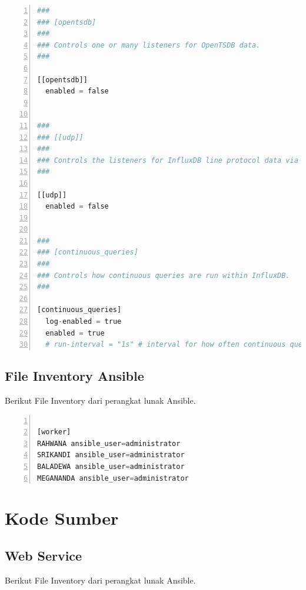 \begin{lstlisting}[numbers=left, frame=single,tabsize=2,breaklines,caption={Kode sumber Model Auth},label=modelAuth, language=python]
###
### [opentsdb]
###
### Controls one or many listeners for OpenTSDB data.
###

[[opentsdb]]
  enabled = false
 

###
### [[udp]]
###
### Controls the listeners for InfluxDB line protocol data via UDP.
###

[[udp]]
  enabled = false
 

###
### [continuous_queries]
###
### Controls how continuous queries are run within InfluxDB.
###

[continuous_queries]
  log-enabled = true
  enabled = true
  # run-interval = "1s" # interval for how often continuous queries will be checked if they need to run

\end{lstlisting}

\section{File Inventory Ansible}
\label{lampiranpushnotif}
  Berikut File Inventory dari perangkat lunak Ansible.
  
  \begin{lstlisting}[numbers=left, frame=single,tabsize=2,breaklines,caption={Kode sumber Model Auth},label=modelAuth, language=python]

[worker]
RAHWANA ansible_user=administrator
SRIKANDI ansible_user=administrator
BALADEWA ansible_user=administrator
MEGANANDA ansible_user=administrator

\end{lstlisting}

\chapter{Kode Sumber}
\section{Web Service}
\label{lampiranpushnotif}
  Berikut File Inventory dari perangkat lunak Ansible.
  

